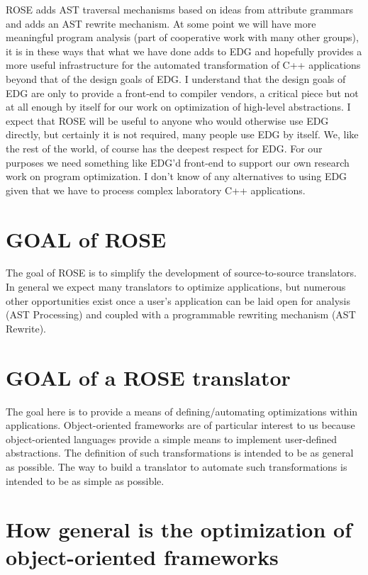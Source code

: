    ROSE adds AST traversal mechanisms based on ideas from attribute grammars
and adds an AST rewrite mechanism.  At some point we will have more meaningful
program analysis (part of cooperative work with many other groups), it is in 
these ways that what we have done adds to EDG and
hopefully provides a more useful infrastructure for the automated transformation of
C++ applications beyond that of the design goals of EDG.  I understand that the
design goals of EDG are only to provide a front-end to compiler vendors, a critical
piece but not at all enough by itself for our work on optimization of high-level 
abstractions.  I expect that ROSE will be useful to anyone who would otherwise use 
EDG directly, but certainly it is not required, many people use EDG by itself.
We, like the rest of the world, of course has the deepest respect for EDG.
For our purposes we need something like EDG'd front-end to support our own research work
on program optimization. I don't know of any alternatives to using EDG given that 
we have to process complex laboratory C++ applications.

\section{GOAL of ROSE}
   The goal of ROSE is to simplify the development of source-to-source translators.
In general we expect many translators to optimize applications, but numerous
other opportunities exist once a user's application can be laid open for analysis
(AST Processing) and coupled with a programmable rewriting mechanism (AST Rewrite).

\section{GOAL of a ROSE translator}

   The goal here is to provide a means of defining/automating optimizations within
applications. Object-oriented frameworks are of particular interest to us because object-oriented
languages provide a simple means to implement user-defined abstractions.
The definition of such transformations is intended to be as general
as possible. The way to build a translator to automate such transformations
is intended to be as simple as possible.

\section{ How general is the optimization of object-oriented frameworks }

